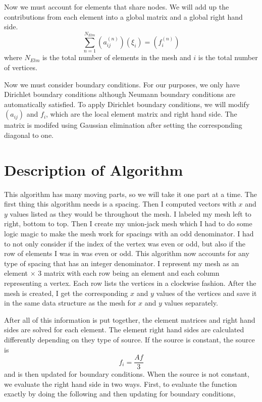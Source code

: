 \documentclass[11pt, oneside]{article}   	%
\begin{document}
Now we must account for elements that share nodes. We will add up the contributions from each element into a global matrix and a global right hand side. 
\[
\sum_{n=1}^{N_{Elm}} \left( a_{ij}^{(n)} \right) (\xi_i) = \left(f_i^{(n)}\right)
\]
where $N_{Elm}$ is the total number of elements in the mesh and $i$ is the total number of vertices.

Now we must consider boundary conditions. For our purposes, we only have Dirichlet boundary conditions although Neumann boundary conditions are automatically satisfied. To apply Dirichlet boundary conditions, we will modify $(a_{ij})$ and $f_i$, which are the local element matrix and right hand side. The matrix is modifed using Gaussian elimination after setting the corresponding diagonal to one.

\section{Description of Algorithm}

This algorithm has many moving parts, so we will take it one part at a time. The first thing this algorithm needs is a spacing. Then I computed vectors with $x$ and $y$ values listed as they would be throughout the mesh. I labeled my mesh left to right, bottom to top. Then I create my union-jack mesh which I had to do some logic magic to make the mesh work for spacings with an odd denominator. I had to not only consider if the index of the vertex was even or odd, but also if the row of elements I was in was even or odd. This algorithm now accounts for any type of spacing that has an integer denominator. I represent my mesh as an element $\times$ 3 matrix with each row being an element and each column representing a vertex. Each row lists the vertices in a clockwise fashion. After the mesh is created, I get the corresponding $x$ and $y$ values of the vertices and save it in the same data structure as the mesh for $x$ and $y$ values separately. 

After all of this information is put together, the element matrices and right hand sides are solved for each element. The element right hand sides are calculated differently depending on they type of source. If the source is constant, the source is 
\[
f_i = \frac{Af}{3}
\]
and is then updated for boundary conditions. When the source is not constant, we evaluate the right hand side in two ways. First, to evaluate the function exactly by doing the following and then updating for boundary conditions,
\end{document}
